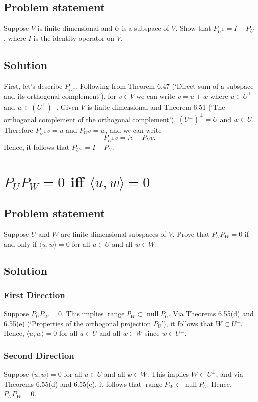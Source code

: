 \documentclass{article}
\begin{document}
\subsection*{Problem statement}
Suppose $V$ is finite-dimensional and $U$ is a subspace of $V$. 
Show that $P_{U^\bot}=I-P_{U}$, where $I$ is the identity operator on $V$.

\subsection*{Solution}
First, let's describe $P_{U^\bot}$. 
Following from Theorem 6.47 (`Direct sum of a subspace and its orthogonal complement'), for $v\in V$ we can write $v=u+w$ where $u\in U^\bot$ and $w\in (U^\bot)^\bot$. 
Given $V$ is finite-dimensional and Theorem 6.51 (`The orthogonal complement of the orthogonal complement'), $(U^\bot)^\bot=U$ and $w\in U$. 
Therefore $P_{U^\bot}v=u$ and $P_{U}v=w$, and we can write
\[P_{U^\bot}v=Iv-P_{U}v.\]
Hence, it follows that $P_{U^\bot}=I-P_{U}$.

\clearpage

\section{$P_U P_W=0$ iff $\langle u,w\rangle=0$}
\subsection*{Problem statement}
Suppose $U$ and $W$ are finite-dimensional subspaces of $V$. 
Prove that $P_U P_W=0$ if and only if $\langle u,w\rangle=0$ for all $u\in U$ and all $w\in W$.

\subsection*{Solution}
\subsubsection*{First Direction}
Suppose $P_U P_W=0$. 
This implies $\operatorname{range}P_W \subset \operatorname{null} P_U$. 
Via Theorems 6.55(d) and 6.55(e) (`Properties of the orthogonal projection $P_U$'), it follows that \newline$W\subset U^\bot$. 
Hence, $\langle u,w\rangle=0$ for all $u\in U$ and all $w\in W$ since $w\in U^\bot$. 

\subsubsection*{Second Direction}
Suppose $\langle u,w\rangle=0$ for all $u\in U$ and all $w\in W$. 
This implies $W\subset U^\bot$, and via Theorems 6.55(d) and 6.55(e), it follows that $\operatorname{range}P_W \subset \operatorname{null} P_U$. 
Hence, $P_U P_W=0$. 
\end{document}

